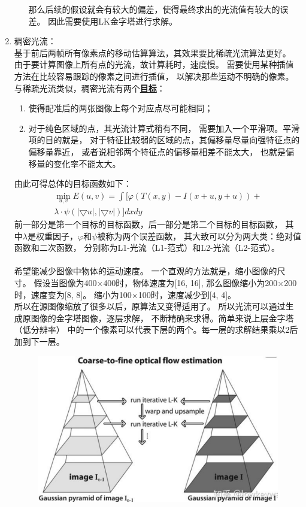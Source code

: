 \documentclass[AutoFakeBold]{MyFormat}
\begin{document}
\begin{enumerate}
\begin{enumerate}
        那么后续的假设就会有较大的偏差，使得最终求出的光流值有较大的误差。
        因此需要使用LK金字塔进行求解。
    \end{enumerate}
    \item 稠密光流：\\
    基于前后两帧所有像素点的移动估算算法，其效果要比稀疏光流算法更好。
    由于要计算图像上所有点的光流，故计算耗时，速度慢。
    需要使用某种插值方法在比较容易跟踪的像素之间进行插值，
    以解决那些运动不明确的像素。\\
    与稀疏光流类似，稠密光流有两个\textbf{\Large \underline{目标}}：
    \begin{enumerate}
        \item 使得配准后的两张图像上每个对应点尽可能相同；
        \item 对于纯色区域的点，其光流计算式稍有不同，
        需要加入一个平滑项。平滑项的目的就是，
        对于特征比较弱的区域的点，其偏移量尽量向强特征点的偏移量靠近，
        或者说相邻两个特征点的偏移量相差不能太大，
        也就是偏移量的变化率不能太大。
    \end{enumerate}
    由此可得总体的目标函数如下：
    \begin{equation}
        \begin{split}
            \min_{u, v}E(u, v)=\int [\varphi (T(x, y)-I(x+u, y+u))+\\
            \lambda\cdot \psi(\left |\bigtriangledown u \right |, \left | 
            \bigtriangledown v \right |)]dxdy
        \end{split}
    \end{equation}
    前一部分是第一个目标的目标函数，后一部分是第二个目标的目标函数，
    其中$\lambda$是权重因子，$\varphi$和$\psi$被称为两个误差函数，
    其大致可以分为两大类：绝对值函数和二次函数，
    分别称为L1-光流（L1-范式）和L2-光流（L2-范式）。\\\\
    希望能减少图像中物体的运动速度。
    一个直观的方法就是，缩小图像的尺寸。
    假设当图像为400$\times$400时，物体速度为[16, 16],
    那么图像缩小为200$\times$200时，速度变为[8, 8]。
    缩小为100$\times$100时，速度减少到[4, 4]。\\
    所以在源图像缩放了很多以后，原算法又变得适用了。
    所以光流可以通过生成原图像的金字塔图像，逐层求解，
    不断精确来求得。简单来说上层金字塔（低分辨率）
    中的一个像素可以代表下层的两个。每一层的求解结果乘以2后加到下一层。
    \begin{figure}[!h]
        \centering
        \includegraphics[width=0.6\linewidth]{figures/2022.05.24/pic8.png}

\end{figure}
\end{enumerate}
\end{document}
